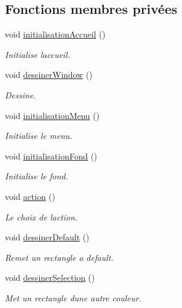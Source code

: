 \subsection*{Fonctions membres privées}
\begin{DoxyCompactItemize}
\item 
void \hyperlink{class_s_f_m_l_menu_a563ba1ff94cc5a0a14345ef375f8549f}{initialisation\+Accueil} ()
\begin{DoxyCompactList}\small\item\em Initialise l\textquotesingle{}accueil. \end{DoxyCompactList}\item 
void \hyperlink{class_s_f_m_l_menu_a5f87fa77e5029f1d2127e6796c6b6fd1}{dessiner\+Window} ()
\begin{DoxyCompactList}\small\item\em Dessine. \end{DoxyCompactList}\item 
void \hyperlink{class_s_f_m_l_menu_a324c14139ab2c9587a0df5050397fa95}{initialisation\+Menu} ()
\begin{DoxyCompactList}\small\item\em Initialise le menu. \end{DoxyCompactList}\item 
void \hyperlink{class_s_f_m_l_menu_a57d8df3871bf10c7ba48dcebdbbd7359}{initialisation\+Fond} ()
\begin{DoxyCompactList}\small\item\em Initialise le fond. \end{DoxyCompactList}\item 
void \hyperlink{class_s_f_m_l_menu_abbed99b9e874fd8e3f40a7b748576182}{action} ()
\begin{DoxyCompactList}\small\item\em Le choix de l\textquotesingle{}action. \end{DoxyCompactList}\item 
void \hyperlink{class_s_f_m_l_menu_acd577e51e9a54e6028976e5c739e5e92}{dessiner\+Default} ()
\begin{DoxyCompactList}\small\item\em Remet un rectangle a default. \end{DoxyCompactList}\item 
void \hyperlink{class_s_f_m_l_menu_a9277783624a1058bfa5cb7e9dbc16d5c}{dessiner\+Selection} ()
\begin{DoxyCompactList}\small\item\em Met un rectangle d\textquotesingle{}une autre couleur. \end{DoxyCompactList}\item 

\end{DoxyCompactItemize}
